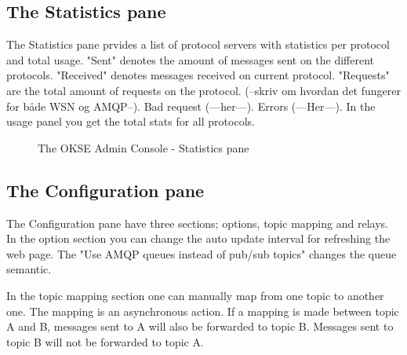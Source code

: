 \subsection{The Statistics pane}
The Statistics pane prvides a list of protocol servers with statistics per protocol and total usage. "Sent" denotes the amount of messages sent on the different protocols. "Received" denotes messages received on current protocol. "Requests" are the total amount of requests on the protocol. (--skriv om hvordan det fungerer for både WSN og AMQP--). Bad request (---her---). Errors (---Her---). In the usage panel you get the total stats for all protocols.

\begin{center}
  \begin{figure}[ht!]
    \caption{The OKSE Admin Console - Statistics pane} 
    \label{fig:OKSE Admin Console - Statistics pane}
  \end{figure}
\end{center}

\subsection{The Configuration pane}
The Configuration pane have three sections; options, topic mapping and relays. In the option section you can change the auto update interval for refreshing the web page. The "Use AMQP queues instead of pub/sub topics" changes the queue semantic.

In the topic mapping section one can manually map from one topic to another one. The mapping is an asynchronous action. If a mapping is made between topic A and B, messages sent to A will also be forwarded to topic B. Messages sent to topic B will not be forwarded to topic A.

